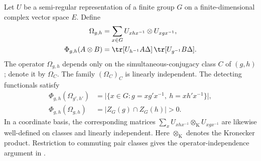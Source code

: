 \begin{lemma}%
    \label{thm:peps_pair_conjugacy_operator_independence}
    \leanok
    Let $U$ be a semi-regular representation of a finite group $G$ on a
    finite-dimensional complex vector space $E$. Define
    \begin{align}
        \Omega_{g,h}
         & =\sum_{x\in G}U_{xhx^{-1}}\otimes U_{xgx^{-1}},
        \label{eq:peps_pair_operator_sum}                  \\
        \Phi_{g,h}(A\otimes B)
         & =\tr[U_{h^{-1}}A\Delta]\,
        \tr[U_{g^{-1}}B\Delta].
        \label{eq:peps_pair_operator_dual}
    \end{align}
    The operator $\Omega_{g,h}$ depends only on the simultaneous-conjugacy
    class $C$ of $(g,h)$; denote it by $\Omega_C$. The family
    $(\Omega_C)_C$ is linearly independent. The detecting functionals satisfy
    \begin{align}
        \Phi_{g,h}(\Omega_{g',h'})
         & =\bigl|\{x\in G:
        g=xg'x^{-1},\ h=xh'x^{-1}\}\bigr|,
        \label{eq:peps_pair_operator_count} \\
        \Phi_{g,h}(\Omega_{g,h})
         & =|Z_G(g)\cap Z_G(h)|>0.
        \label{eq:peps_pair_operator_diagonal}
    \end{align}
    In a coordinate basis, the corresponding matrices
    $\sum_x U_{xhx^{-1}}\otimes_{\mathrm K}U_{xgx^{-1}}$ are likewise
    well-defined on classes and linearly independent. Here
    $\otimes_{\mathrm K}$ denotes the Kronecker product.
    Restriction to commuting pair classes gives the operator-independence
    argument in \cite[Theorem~5.9]{Schuch2010PEPS}.
\end{lemma}

